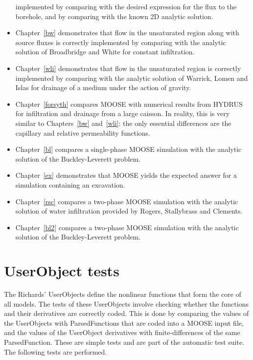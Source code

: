 \documentclass[]{scrreprt}
\begin{document}
\begin{itemize}
  implemented by comparing with the desired expression for the flux to
  the borehole, and by comparing with the known 2D analytic solution.
\item Chapter~\ref{bw} demonstrates that flow in the unsaturated
  region along with source fluxes is correctly implemented by comparing
  with the analytic solution of Broadbridge and White for constant
  infiltration.
\item Chapter~\ref{wli} demonstrates that flow in the unsaturated
  region is correctly implemented by comparing with the analytic
  solution of Warrick, Lomen and Islas for drainage of a medium under
  the action of gravity.
\item Chapter~\ref{forsyth} compares MOOSE with numerical results from
  HYDRUS for infiltration and drainage from a large caisson.  In
  reality, this is very similar to Chapters~\ref{bw} and~\ref{wli}:
  the only essential differences are the capillary and relative
  permeability functions.
\item Chapter~\ref{bl} compares a single-phase MOOSE simulation with
  the analytic solution of the Buckley-Leverett problem.
\item Chapter~\ref{ex} demonstrates that MOOSE yields the expected
  answer for a simulation containing an excavation.
\item Chapter~\ref{rsc} compares a two-phase MOOSE simulation with
  the analytic solution of water infiltration provided by Rogers, Stallybrass and Clements.
\item Chapter~\ref{bl2} compares a two-phase MOOSE simulation with
  the analytic solution of the Buckley-Leverett problem.
\end{itemize}


\chapter{UserObject tests}
\label{uo}

The Richards' UserObjects define the nonlinear functions that form the
core of all models.  The tests of these UserObjects involve checking
whether the functions and their derivatives are correctly coded.  This
is done by comparing the values of the UserObjects with
ParsedFunctions that are coded into a MOOSE input file, and the values
of the UserObject derivatives with finite-differences of the same
ParsedFunction.  These are simple tests and are part of the automatic
test suite.  The following tests are performed.
\end{document}
